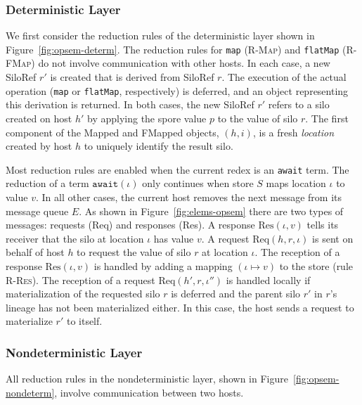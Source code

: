 \documentclass[10pt]{sigplanconf}
\theoremstyle{definition}
\theoremstyle{definition}
\begin{document}
\subsubsection{Deterministic Layer}
\label{sec:det-layer}

We first consider the reduction rules of the deterministic layer shown in
Figure~\ref{fig:opsem-determ}. The reduction rules for \texttt{map}
(\textsc{R-Map}) and \texttt{flatMap} (\textsc{R-FMap}) do not involve
communication with other hosts. In each case, a new SiloRef $r'$ is created
that is derived from SiloRef $r$. The execution of the actual operation
(\texttt{map} or \texttt{flatMap}, respectively) is deferred, and an object
representing this derivation is returned. In both cases, the new SiloRef $r'$
refers to a silo created on host $h'$ by applying the spore value $p$ to the
value of silo $r$. The first component of the Mapped and FMapped objects, $(h,
i)$, is a fresh \emph{location} created by host $h$ to uniquely identify the
result silo.

Most reduction rules are enabled when the current redex is an \texttt{await}
term. The reduction of a term $\texttt{await}(\iota)$ only continues when store
$S$ maps location $\iota$ to value $v$. In all other cases, the current host
removes the next message from its message queue $E$. As shown in
Figure~\ref{fig:elems-opsem} there are two types of messages: requests (Req)
and responses (Res). A response $\text{Res}(\iota, v)$ tells its receiver that
the silo at location $\iota$ has value $v$. A request $\text{Req}(h, r, \iota)$
is sent on behalf of host $h$ to request the value of silo $r$ at location
$\iota$. The reception of a response $\text{Res}(\iota, v)$ is handled by
adding a mapping $(\iota \mapsto v)$ to the store (rule \textsc{R-Res}). The
reception of a request $\text{Req}(h', r, \iota'')$ is handled locally if
materialization of the requested silo $r$ is deferred and the parent silo $r'$
in $r$'s lineage has not been materialized either. In this case, the host sends
a request to materialize $r'$ to itself.



\subsubsection{Nondeterministic Layer}
\label{sec:nondet-layer}

All reduction rules in the nondeterministic layer, shown in
Figure~\ref{fig:opsem-nondeterm}, involve communication between two hosts.
\end{document}
